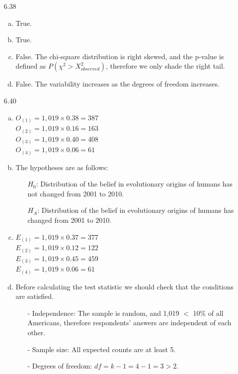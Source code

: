 \documentclass[11pt]{article}
\begin{document}
\begin{enumerate}
%

\item[6.38]
\begin{enumerate}[(a)]
\item True.
\item True.
\item False. The chi-square distribution is right skewed, and the p-value is defined as $P(\chi^2 > X^2_{observed})$, therefore we only shade the right tail.
\item False. The variability increases as the degrees of freedom increases.
\end{enumerate}

%

\item[6.40]
\begin{enumerate}[(a)]
\item $O_{(1)} = 1,019 \times  0.38 = 387$ \\
$O_{(2)} = 1,019 \times  0.16 = 163$ \\
$O_{(3)} = 1,019 \times  0.40= 408$ \\
$O_{(4)} = 1,019 \times  0.06 = 61$
\item The hypotheses are as follows:
\begin{itemize}
\item[] $H_0$: Distribution of the belief in evolutionary origins of humans has not changed from 2001 to 2010.
\item[] $H_A$: Distribution of the belief in evolutionary origins of humans has changed from 2001 to 2010.
\end{itemize}

\item  $E_{(1)} = 1,019 \times  0.37 = 377$ \\
$E_{(2)} = 1,019 \times  0.12 = 122$ \\
$E_{(3)} = 1,019 \times  0.45= 459$ \\
$E_{(4)} = 1,019 \times  0.06 = 61$
\item Before calculating the test statistic we should check that the conditions are satisfied. 
\begin{itemize}
\item[-] Independence:  The sample is random, and 1,019 $<$ 10\% of all Americans, therefore respondents' answers are independent of each other.
\item[-] Sample size: All expected counts are at least 5.
\item[-] Degrees of freedom: $df = k - 1 = 4 - 1 = 3 > 2$.
\end{itemize}


\end{enumerate}
\end{enumerate}
\end{document}
